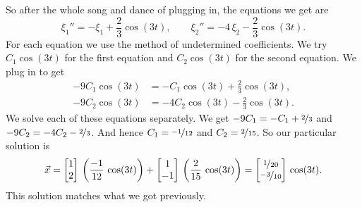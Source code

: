 \documentclass{ximera}
\begin{document}
\begin{exampleSol}
\begin{equation*}
    \end{equation*}
    So after the whole song and dance of plugging in, the equations we get are
    \begin{equation*}
        \xi_1'' = - \xi_1 + \frac{2}{3} \cos (3t) , \qquad \xi_2'' = -4 \, \xi_2 - \frac{2}{3} \cos (3t) .
    \end{equation*}
    For each equation we use the method of undetermined coefficients. We try $C_1 \cos (3t)$ for the first equation and $C_2 \cos (3t)$ for the second equation. We plug in to get
    \begin{align*}
        - 9 C_1 \cos (3t) & = - C_1 \cos (3t) + \frac{2}{3} \cos (3t) , \\
        - 9 C_2 \cos (3t) & = - 4 C_2 \cos (3t) - \frac{2}{3} \cos (3t) .
    \end{align*}
    We solve each of these equations separately.  We get $- 9 C_1 = - C_1 + \nicefrac{2}{3}$ and $- 9 C_2 = - 4C_2 - \nicefrac{2}{3}$.  And hence $C_1 = \nicefrac{-1}{12}$ and $C_2 = \nicefrac{2}{15}$. So our particular solution is
    \begin{equation*}
        \vec{x} =
        \begin{bmatrix} 
            1 \\
            2 
        \end{bmatrix} \,
        \left( \frac{-1}{12} \, \cos (3t) \right) +
        \begin{bmatrix} 
            1 \\
            -1 
        \end{bmatrix} \,
        \left( \frac{2}{15} \, \cos (3t) \right) =
        \begin{bmatrix} 
            \nicefrac{1}{20} \\
            \nicefrac{-3}{10} 
        \end{bmatrix} \,
        \cos (3t) .
    \end{equation*}
    This solution matches what we got previously.%
\end{exampleSol}
\end{document}
